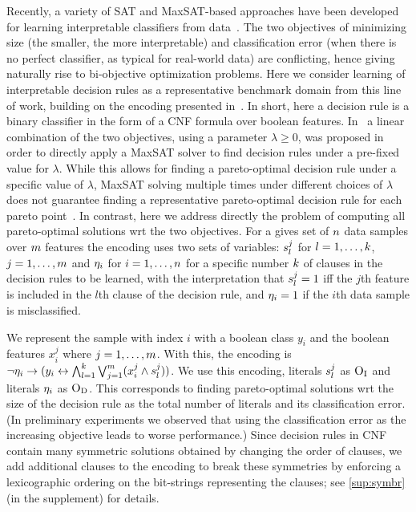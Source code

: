 Recently, a variety of SAT and MaxSAT-based approaches have been developed for
learning interpretable classifiers from data~\autocite{DBLP:conf/ijcai/Ignatiev0NS21,DBLP:conf/cp/MaliotovM18,DBLP:conf/ijcai/NarodytskaIPM18,DBLP:conf/ijcai/Hu0HH20,DBLP:journals/corr/abs-2010-09919,DBLP:conf/cp/YuISB20,DBLP:conf/cade/IgnatievPNM18}. The two objectives
of minimizing size (the smaller, the more interpretable) and classification error
(when there is no perfect classifier, as typical for real-world data) are conflicting,
hence giving naturally rise to bi-objective optimization problems.
Here we consider learning of interpretable decision rules as a representative benchmark domain
from this line of work, building on the encoding presented in~\textcite{DBLP:conf/cp/MaliotovM18}.
In short, here  a decision rule is a binary classifier in the form of a CNF formula over boolean features.
In~\textcite{DBLP:conf/cp/MaliotovM18} a linear combination of the
two objectives, using a parameter $\lambda\geq 0$,  was proposed in order to directly apply a MaxSAT solver
to find decision rules under a pre-fixed value for $\lambda$.
While this allows for finding a pareto-optimal decision rule under a specific value of $\lambda$,
MaxSAT solving multiple times under different choices of $\lambda$ does not  guarantee finding
a representative pareto-optimal  decision rule for each pareto point~\autocite{survey}.
In contrast, here we address directly the
problem of computing all pareto-optimal solutions wrt the two objectives.
For a gives set of $n$ data samples over $m$ features
the encoding uses two sets of variables: $s_l^j$ for $l=1,\dots,k$, $j=1,\dots,m$ and $\eta_i$ for $i=1,\dots,n$
for a specific number  $k$ of clauses in the  decision rules to be learned,
with the interpretation that $s_l^j=1$ iff
the $j$th feature is included in the $l$th clause of the decision rule, and $\eta_i=1$ if the $i$th
data sample is misclassified.

We represent the sample with index $i$ with a boolean class $y_i$ and the boolean features $x_i^j$ where $j=1,\dots,m$.
With this, the encoding is $\lnot \eta_i \rightarrow (y_i \leftrightarrow \bigwedge_{l=1}^k \bigvee_{j=1}^m (x_i^j \land s_l^j))$.
We use this encoding, literals $s_l^j$ as $\textsc{O}_{\text{I}}$ and literals $\eta_i$ as $\textsc{O}_{\text{D}}$.
This corresponds to finding pareto-optimal solutions wrt the size of the decision rule as the total number of literals and its classification error.
(In preliminary experiments we observed that using the classification error as the increasing objective leads to worse performance.)
Since decision rules in CNF contain many symmetric solutions obtained by changing the order of clauses, we
add additional clauses to the encoding to break these symmetries by enforcing a lexicographic ordering on the bit-strings
representing the clauses; see \cref{sup:symbr} (in the supplement) for details.


